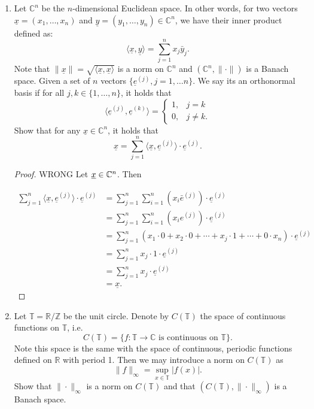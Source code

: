\documentclass[11pt,oneside,english]{amsart}
\theoremstyle{definition}
\newcommand{\MB}[1]{\mathbb{#1}}
\renewcommand{\vec}[1]{\underline{#1}}
\begin{document}
\rightline{\today}



\vspace{5mm}
\begin{enumerate}
\itemsep7mm



\item Let $\MB{C}^n$ be the $n$-dimensional Euclidean space. In other words, for two vectors $\vec x=(x_1,\ldots,x_n)$ and $\vec y=(y_1,\ldots, y_n)\in\MB{C}^n$, we have their inner product defined as:
\[
\langle\vec x,\vec y\rangle=\sum^{n}_{j=1}x_j\bar y_j.
\]
Note that $\|\vec x\|=\sqrt{\langle \vec x,\vec x\rangle}$ is a norm on $\MB{C}^n$ and $(\MB{C}^n, \|\cdot\|)$ is a Banach space. Given a set of $n$ vectors $\{\vec e^{(j)}, j=1,\ldots n\}$. We say its an orthonormal basis if for all $j,k\in\{1,\ldots, n\}$, it holds that
\[
\langle\vec e^{(j)},\vec e^{(k)}\rangle=\begin{cases}1, & j=k \\0, & j\neq k.\end{cases}
\]
Show that for any $\vec x\in\MB{C}^n$, it holds that
\[
\vec x=\sum^n_{j=1}\langle \vec x,\vec e^{(j)}\rangle \cdot \vec e^{(j)}.
\] 

\begin{proof}

WRONG 
Let $\uline{x}\in\MB{C}^n$. Then

\begin{align*}	
\sum^n_{j=1}\langle \vec x,\vec e^{(j)}\rangle \cdot \vec e^{(j)}&=\sum_{j=1}^n\sum_{i=1}^n\left(x_i\bar{e}^{(j)}\right)\cdot\vec e^{(j)}\\[2mm]
&=\sum_{j=1}^n\sum_{i=1}^n\left(x_ie^{(j)}\right)\cdot\vec e^{(j)}\\[2mm]
&=\sum_{j=1}^n(x_1\cdot0+x_2\cdot0+\cdots+x_j\cdot1+\cdots+0\cdot x_n)\cdot\vec e^{(j)}\\[2mm]
&=\sum_{j=1}^nx_j\cdot1\cdot\vec e^{(j)}\\[2mm]
&=\sum_{j=1}^nx_j\cdot\vec e^{(j)}\\[2mm]
&=\vec x.
\end{align*}
\end{proof}

\item Let $\MB{T}=\MB{R}/\MB{Z}$ be the unit circle. Denote by $C(\MB{T})$ the space of continuous functions on $\MB{T}$, i.e. 
\[
C(\MB{T})=\{f:\MB{T}\to \MB{C} \mbox{ is continuous on }\MB{T}\}.
\]
Note this space is the same with the space of continuous, periodic functions defined on $\MB{R}$ with period 1. Then we may introduce a norm on $C(\MB{T})$ as 
\[
\|f\|_\infty=\sup_{x\in\MB{T}}|f(x)|.
\]
Show that $\|\cdot \|_\infty$ is a norm on $C(\MB{T})$ and that $(C(\MB{T}),\|\cdot\|_\infty)$ is a Banach space.


\end{enumerate}
\end{document}
